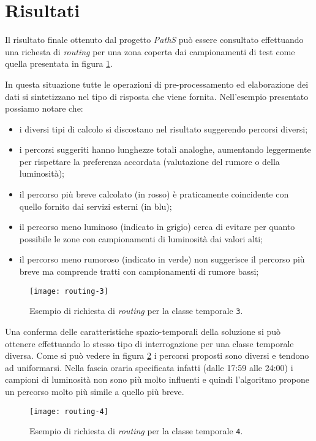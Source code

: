 \section{Risultati}
Il risultato finale ottenuto dal progetto \emph{PathS} può essere consultato effettuando una richesta di \emph{routing} per una zona coperta dai campionamenti di test come quella presentata in figura \ref{fig:routing-3}.

In questa situazione tutte le operazioni di pre-processamento ed elaborazione dei dati si sintetizzano nel tipo di risposta che viene fornita. Nell'esempio presentato possiamo notare che:

\begin{itemize}
  \item i diversi tipi di calcolo si discostano nel risultato suggerendo percorsi diversi;
  \item i percorsi suggeriti hanno lunghezze totali analoghe, aumentando leggermente per rispettare la preferenza accordata (valutazione del rumore o della luminosità);
  \item il percorso più breve calcolato (in rosso) è praticamente coincidente con quello fornito dai servizi esterni (in blu);
  \item il percorso meno luminoso (indicato in grigio) cerca di evitare per quanto possibile le zone con campionamenti di luminosità dai valori alti;
  \item il percorso meno rumoroso (indicato in verde) non suggerisce il percorso più breve ma comprende tratti con campionamenti di rumore bassi;
\end{itemize}

\begin{figure}[ht]
  \centering
  \texttt{[image: routing-3]}
  \caption{\footnotesize{Esempio di richiesta di \emph{routing} per la classe temporale \texttt{3}.}}
  \label{fig:routing-3}
\end{figure}

Una conferma delle caratteristiche spazio-temporali della soluzione si può ottenere effettuando lo stesso tipo di interrogazione per una classe temporale diversa. Come si può vedere in figura \ref{fig:routing-4} i percorsi proposti sono diversi e tendono ad uniformarsi. Nella fascia oraria specificata infatti (dalle 17:59 alle 24:00) i campioni di luminosità non sono più molto influenti e quindi l'algoritmo propone un percorso molto più simile a quello più breve.

\begin{figure}[ht]
  \centering
  \texttt{[image: routing-4]}
  \caption{\footnotesize{Esempio di richiesta di \emph{routing} per la classe temporale \texttt{4}.}}
  \label{fig:routing-4}
\end{figure}

